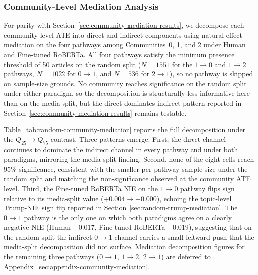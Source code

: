 \subsubsection{Community-Level Mediation Analysis}
\label{sec:random-community-mediation-results}

For parity with Section~\ref{sec:community-mediation-results}, we decompose each community-level ATE into direct and indirect components using natural effect mediation on the four pathways among Communities~0, 1, and 2 under Human and Fine-tuned RoBERTa. All four pathways satisfy the minimum presence threshold of 50 articles on the random split ($N = \num{1551}$ for the $1 \to 0$ and $1 \to 2$ pathways, $N = \num{1022}$ for $0 \to 1$, and $N = 536$ for $2 \to 1$), so no pathway is skipped on sample-size grounds. No community reaches significance on the random split under either paradigm, so the decomposition is structurally less informative here than on the media split, but the direct-dominates-indirect pattern reported in Section~\ref{sec:community-mediation-results} remains testable.

Table~\ref{tab:random-community-mediation} reports the full decomposition under the $Q_{25} \to Q_{75}$ contrast. Three patterns emerge. First, the direct channel continues to dominate the indirect channel in every pathway and under both paradigms, mirroring the media-split finding. Second, none of the eight cells reach 95\% significance, consistent with the smaller per-pathway sample size under the random split and matching the non-significance observed at the community ATE level. Third, the Fine-tuned RoBERTa NIE on the $1 \to 0$ pathway flips sign relative to its media-split value ($+0.004 \to -0.000$), echoing the topic-level Trump-NIE sign flip reported in Section~\ref{sec:random-trump-mediation}. The $0 \to 1$ pathway is the only one on which both paradigms agree on a clearly negative NIE (Human $-0.017$, Fine-tuned RoBERTa $-0.019$), suggesting that on the random split the indirect $0 \to 1$ channel carries a small leftward push that the media-split decomposition did not surface. Mediation decomposition figures for the remaining three pathways ($0 \to 1$, $1 \to 2$, $2 \to 1$) are deferred to Appendix~\ref{sec:appendix-community-mediation}.

